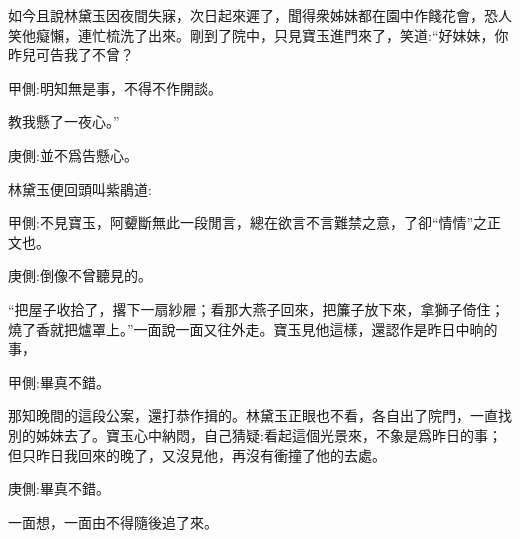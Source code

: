 \begin{parag}
    如今且說林黛玉因夜間失寐，次日起來遲了，聞得衆姊妹都在園中作餞花會，恐人笑他癡懶，連忙梳洗了出來。剛到了院中，只見寶玉進門來了，笑道:“好妹妹，你昨兒可告我了不曾？\begin{note}甲側:明知無是事，不得不作開談。\end{note}教我懸了一夜心。”\begin{note}庚側:並不爲告懸心。\end{note}林黛玉便回頭叫紫鵑道:\begin{note}甲側:不見寶玉，阿顰斷無此一段閒言，總在欲言不言難禁之意，了卻“情情”之正文也。\end{note}\begin{note}庚側:倒像不曾聽見的。\end{note}“把屋子收拾了，撂下一扇紗屜；看那大燕子回來，把簾子放下來，拿獅子倚住；燒了香就把爐罩上。”一面說一面又往外走。寶玉見他這樣，還認作是昨日中晌的事，\begin{note}甲側:畢真不錯。\end{note}那知晚間的這段公案，還打恭作揖的。林黛玉正眼也不看，各自出了院門，一直找別的姊妹去了。寶玉心中納悶，自己猜疑:看起這個光景來，不象是爲昨日的事；但只昨日我回來的晚了，又沒見他，再沒有衝撞了他的去處。\begin{note}庚側:畢真不錯。\end{note}一面想，一面由不得隨後追了來。
\end{parag}


